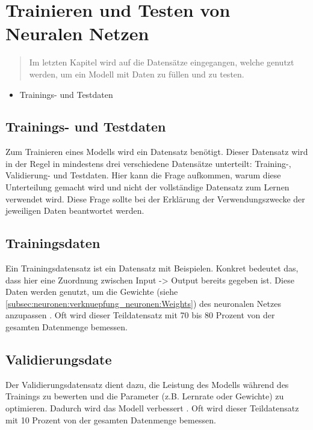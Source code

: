 \newpage
\thispagestyle{empty}
\section{Trainieren und Testen von Neuralen Netzen}\label{sec:trainierentesten}   
\begin{tcolorbox}[title={Inhalte von \textit{Trainings- und Testdaten}}]
  \begin{quotation}\noindent
    Im letzten Kapitel wird auf die Datensätze eingegangen, welche genutzt werden, um ein Modell mit Daten zu füllen und zu testen.
  \end{quotation}
  \begin{itemize}
    \item Trainings- und Testdaten
  \end{itemize}
\end{tcolorbox}

\subsection{Trainings- und Testdaten}\label{subsecsec:trainierentesten:daten}   
Zum Trainieren eines Modells wird ein Datensatz benötigt. Dieser Datensatz wird in der Regel in mindestens drei verschiedene Datensätze unterteilt: Training-, Validierung- und Testdaten.
Hier kann die Frage aufkommen, warum diese Unterteilung gemacht wird und nicht der vollständige Datensatz zum Lernen verwendet wird. 
Diese Frage sollte bei der Erklärung der Verwendungszwecke der jeweiligen Daten beantwortet werden.

\subsection{Trainingsdaten}
Ein Trainingsdatensatz ist ein Datensatz mit Beispielen. Konkret bedeutet das, dass hier eine Zuordnung zwischen Input -> Output bereits gegeben ist.
Diese Daten werden genutzt, um die Gewichte (siehe \ref*{subsec:neuronen:verknuepfung_neuronen:Weights}) des neuronalen Netzes anzupassen \cite[Seite 2ff]{CA18}.
Oft wird dieser Teildatensatz mit 70 bis 80 Prozent von der gesamten Datenmenge bemessen.

\subsection{Validierungsdate}
Der Validierungsdatensatz dient dazu, die Leistung des Modells während des Trainings zu bewerten und die Parameter (z.B. Lernrate oder Gewichte) zu optimieren. 
Dadurch wird das Modell verbessert \cite[Seite 20]{CA18}.
Oft wird dieser Teildatensatz mit 10 Prozent von der gesamten Datenmenge bemessen.

